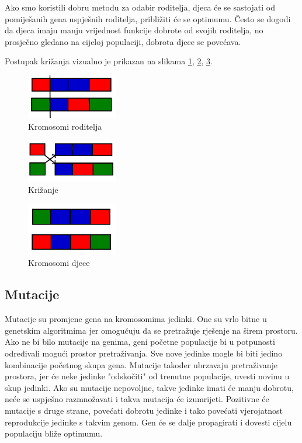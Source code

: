 \documentclass[times, utf8, zavrsni, numeric]{fer}
\begin{document}
Ako smo koristili dobru metodu za odabir roditelja, djeca će se sastojati od pomiješanih gena uspješnih roditelja, približiti će se optimumu. Često se dogodi da djeca imaju manju vrijednost funkcije dobrote od svojih roditelja, no prosječno gledano na cijeloj populaciji, dobrota djece se povećava.

Postupak križanja vizualno je prikazan na slikama \ref{fig:kromosomi roditelja}, \ref{fig:krizanje}, \ref{fig:kromosomi djece}.

\begin{figure}[htb]
\centering
\includegraphics[width=4cm]{images/kromosomi_roditelja.png}
\caption{Kromosomi roditelja}
\label{fig:kromosomi roditelja}
\end{figure}

\begin{figure}[htb]
\centering
\includegraphics[width=4cm]{images/krizanje.png}
\caption{Križanje}
\label{fig:krizanje}
\end{figure}

\begin{figure}[ht]
\centering
\includegraphics[width=4cm]{images/kromosomi_djece.png}
\caption{Kromosomi djece}
\label{fig:kromosomi djece}
\end{figure}

\subsection{Mutacije}
Mutacije su promjene gena na kromosomima jedinki. One su vrlo bitne u genetskim algoritmima jer omogućuju da se pretražuje rješenje na širem prostoru. Ako ne bi bilo mutacije na genima, geni početne populacije bi u potpunosti određivali mogući prostor pretraživanja. Sve nove jedinke mogle bi biti jedino kombinacije početnog skupa gena. Mutacije također ubrzavaju pretraživanje prostora, jer će neke jedinke "odskočiti" od trenutne populacije, uvesti novinu u skup jedinki. Ako su mutacije nepovoljne, takve jedinke imati će manju dobrotu, neće se uspješno razmnožavati i takva mutacija će izumrijeti. Pozitivne će mutacije s druge strane, povećati dobrotu jedinke i tako povećati vjerojatnost reprodukcije jedinke s takvim genom. Gen će se dalje propagirati i dovesti cijelu populaciju bliže optimumu.
\end{document}
